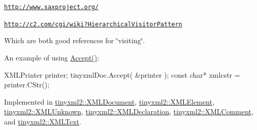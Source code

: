 \begin{DoxyItemize}
\item \href{http://www.saxproject.org/}{\tt http\-://www.\-saxproject.\-org/}
\item \href{http://c2.com/cgi/wiki?HierarchicalVisitorPattern}{\tt http\-://c2.\-com/cgi/wiki?\-Hierarchical\-Visitor\-Pattern}
\end{DoxyItemize}

Which are both good references for \char`\"{}visiting\char`\"{}.

An example of using \hyperlink{classtinyxml2_1_1_x_m_l_node_a81e66df0a44c67a7af17f3b77a152785}{Accept()}\-: \begin{DoxyVerb}XMLPrinter printer;
tinyxmlDoc.Accept( &printer );
const char* xmlcstr = printer.CStr();
\end{DoxyVerb}
 

Implemented in \hyperlink{classtinyxml2_1_1_x_m_l_document_aa08503d24898bf9992ae5e5fb8b0cf87}{tinyxml2\-::\-X\-M\-L\-Document}, \hyperlink{classtinyxml2_1_1_x_m_l_element_a36d65438991a1e85096caf39ad13a099}{tinyxml2\-::\-X\-M\-L\-Element}, \hyperlink{classtinyxml2_1_1_x_m_l_unknown_a0d341ab804a1438a474810bb5bd29dd5}{tinyxml2\-::\-X\-M\-L\-Unknown}, \hyperlink{classtinyxml2_1_1_x_m_l_declaration_a953a7359cc312d15218eb5843a4ca108}{tinyxml2\-::\-X\-M\-L\-Declaration}, \hyperlink{classtinyxml2_1_1_x_m_l_comment_aa382b1be6a8b0650c16a2d88bb499335}{tinyxml2\-::\-X\-M\-L\-Comment}, and \hyperlink{classtinyxml2_1_1_x_m_l_text_ae659d4fc7351a7df11c111cbe1ade46f}{tinyxml2\-::\-X\-M\-L\-Text}.

